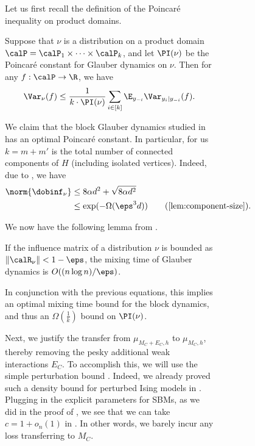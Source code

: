 \documentclass[11pt,letterpaper]{article}
\begin{document}
\begin{figure}
\begin{figure}
Let us first recall the definition of the Poincar\'{e} inequality on product domains.
\begin{definition}
    \label{lem:poincare}
    Suppose that $\nu$ is a distribution on a product domain $\calP = \calP_1 \times \cdots \times \calP_k$, and let $\PI(\nu)$ be the Poincar\'{e} constant for Glauber dynamics on $\nu$. 
    Then for any $f : \calP \to \R$, we have
    \[
        \Var_\nu(f) \le \frac{1}{k \cdot \PI(\nu)} \sum_{i \in [k]} \E_{y_{-i}} \Var_{y_i | y_{-i}}(f).
    \]
\end{definition}
We claim that the block Glauber dynamics studied in  has an optimal Poincar\'{e} constant. 
In particular, for us $k = m + m'$ is the total number of connected components of $H$ (including isolated vertices).
Indeed, due to , we have  
\begin{align*}
    \norm{\dobinf_{\nu}} &\le 8\alpha d^2 + \sqrt{8\alpha d^2} \\
    &\le \exp(-\Omega(\eps^3 d)) \tag*{(\Cref{lem:component-size})}.
\end{align*}

We now have the following lemma from \cite{Hay06}.

\begin{lemma}
    If the influence matrix of a distribution $\nu$ is bounded as $\|\calR_{\nu}\| < 1-\eps$, the mixing time of Glauber dynamics is $O((n \log n)/\eps)$.
\end{lemma}

In conjunction with the previous equations, this implies an optimal mixing time bound for the block dynamics, and thus an $\Omega\left(\frac{1}{k}\right)$ bound on $\PI(\nu)$.

Next, we justify the transfer from $\mu_{M_C+E_C, h}$ to $\mu_{M_C, h}$, thereby removing the pesky additional weak interactions $E_C$. 
To accomplish this, we will use the simple perturbation bound .
Indeed, we already proved such a density bound for perturbed Ising models in .
Plugging in the explicit parameters for SBMs, as we did in the proof of , we see that we can take $c = 1 + o_n(1)$ in .
In other words, we barely incur any loss transferring to $M_C$. 


\end{figure}
\end{figure}
\end{document}
